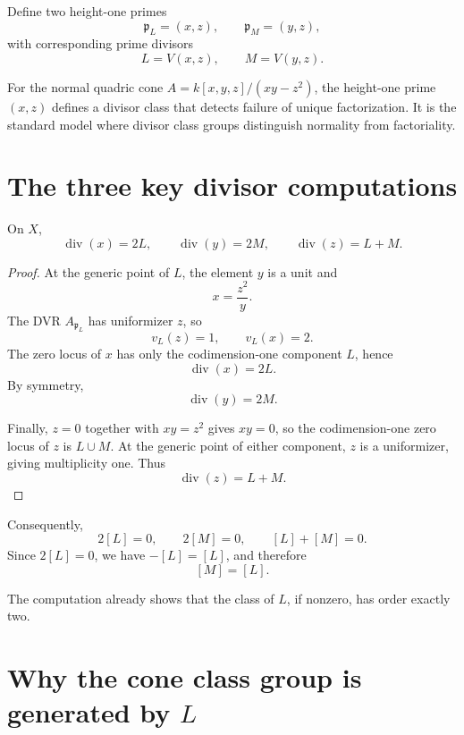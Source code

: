 Define two height-one primes
\[
  \mathfrak p_L=(x,z),
  \qquad
  \mathfrak p_M=(y,z),
\]
with corresponding prime divisors
\[
  L=V(x,z),
  \qquad
  M=V(y,z).
\]



\begin{example}\label{ex:vi41-expand-02}
For the normal quadric cone $A=k[x,y,z]/(xy-z^2)$, the height-one prime $(x,z)$ defines a divisor class that detects failure of unique factorization.  It is the standard model where divisor class groups distinguish normality from factoriality.
\end{example}
\section{The three key divisor computations}

\begin{proposition}\label{prop:vi41-cone-coordinate-divisors}
On \(X\),
\[
 \boxed{
 \operatorname{div}(x)=2L,\qquad
 \operatorname{div}(y)=2M,\qquad
 \operatorname{div}(z)=L+M.
 }
\]
\end{proposition}

\begin{proof}
At the generic point of \(L\), the element \(y\) is a unit and
\[
 x=\frac{z^2}{y}.
\]
The DVR \(A_{\mathfrak p_L}\) has uniformizer \(z\), so
\[
 v_L(z)=1,\qquad v_L(x)=2.
\]
The zero locus of \(x\) has only the codimension-one component \(L\), hence
\[
 \operatorname{div}(x)=2L.
\]
By symmetry,
\[
 \operatorname{div}(y)=2M.
\]

Finally, \(z=0\) together with \(xy=z^2\) gives \(xy=0\), so the codimension-one zero locus of \(z\) is \(L\cup M\). At the generic point of either component, \(z\) is a uniformizer, giving multiplicity one. Thus
\[
 \operatorname{div}(z)=L+M.
\]
\end{proof}

Consequently,
\[
 2[L]=0,
 \qquad
 2[M]=0,
 \qquad
 [L]+[M]=0.
\]
Since \(2[L]=0\), we have \(-[L]=[L]\), and therefore
\[
 [M]=[L].
\]

The computation already shows that the class of \(L\), if nonzero, has order exactly two.

\section{Why the cone class group is generated by \(L\)}

